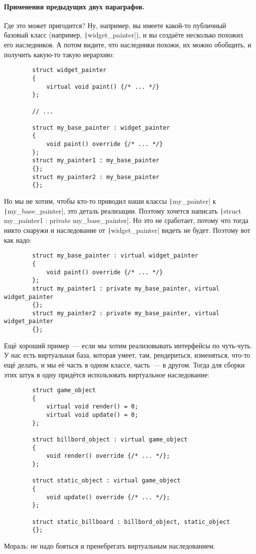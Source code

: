\documentclass{article}
\begin{document}
    \paragraph{Применения предыдущих двух параграфов.}
    Где это может пригодится? Ну, например, вы имеете какой-то публичный базовый класс (например, \texttt|widget_painter|), и вы создаёте несколько похожих его наследников. А потом видите, что наследники похожи, их можно обобщить, и получить какую-то такую иерархию:
    \begin{verbatim}
        struct widget_painter
        {
            virtual void paint() {/* ... */}
        };

        // ...

        struct my_base_painter : widget_painter
        {
            void paint() override {/* ... */}
        };
        struct my_painter1 : my_base_painter
        {};
        struct my_painter2 : my_base_painter
        {};
    \end{verbatim}
    Но мы не хотим, чтобы кто-то приводил наши классы \texttt|my_painter| к \texttt|my_base_painter|, это деталь реализации. Поэтому хочется написать \texttt|struct my_painter1 : private my_base_painter|. Но это не сработает, потому что тогда никто снаружи и наследование от \texttt|widget_painter| видеть не будет. Поэтому вот как надо:
    \begin{verbatim}
        struct my_base_painter : virtual widget_painter
        {
            void paint() override {/* ... */}
        };
        struct my_painter1 : private my_base_painter, virtual widget_painter
        {};
        struct my_painter2 : private my_base_painter, virtual widget_painter
        {};
    \end{verbatim}
    Ещё хороший пример~--- если мы хотим реализовывать интерфейсы по чуть-чуть. У нас есть виртуальная база, которая умеет, там, рендериться, изменяться, что-то ещё делать, и мы её часть в одном классе, часть~--- в другом. Тогда для сборки этих штук в одну придётся использовать виртуальное наследование:
    \begin{verbatim}
        struct game_object
        {
            virtual void render() = 0;
            virtual void update() = 0;
        };

        struct billbord_object : virtual game_object
        {
            void render() override {/* ... */};
        };

        struct static_object : virtual game_object
        {
            void update() override {/* ... */};
        };

        struct static_billboard : billbord_object, static_object
        {};
    \end{verbatim}
    Мораль: не надо бояться и пренебрегать виртуальным наследованием.
\end{document}
